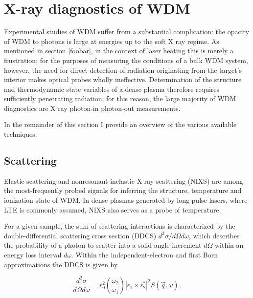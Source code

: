 \documentclass [11pt, proquest, article] {uwthesis}[2016/11/22]
\begin{document}

\section{X-ray diagnostics of WDM}
Experimental studies of WDM suffer from a substantial complication: the opacity of WDM to photons is large at energies up to the soft X ray regime. As mentioned in section \ref{foobar}, in the context of laser heating this is merely a frustration; for the purposes of measuring the conditions of a bulk WDM system, however, the need for direct detection of radiation originating from the target's interior makes optical probes wholly ineffective. Determination of the structure and thermodynamic state variables of a dense plasma therefore requires sufficiently penetrating radiation; for this reason, the large majority of WDM diagnostics are X ray photon-in photon-out measurements. 

In the remainder of this section I provide an overview of the various available techniques.

\subsection{Scattering}
Elastic scattering and nonresonant inelastic X-ray scattering (NIXS) are among the most-frequently probed signals for inferring the structure, temperature and ionization state of WDM. In dense plasmas generated by long-pulse lasers, where LTE is commonly assumed, NIXS also serves as a probe of temperature.

For a given sample, the sum of scattering interactions is characterized by the double-differential scattering cross section (DDCS) $d^2\sigma/d\Omega d\omega$, which describes the probability of a photon to scatter into a solid angle increment $d\Omega$ within an energy loss interval $d\omega$. Within the independent-electron and first Born approximations the DDCS is given by

\label{ddcs}
\begin{equation}
\frac{d^2\sigma}{d\Omega d\omega} = r_0^2 (\frac{\omega_2}{\omega_1}) |\epsilon_1 \times \epsilon_2^*|^2 S(\vec{q}, \omega),
\end{equation}
\end{document}
